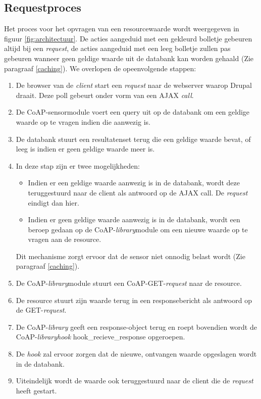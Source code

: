\subsection{Requestproces}
Het proces voor het opvragen van een resourcewaarde wordt weergegeven in figuur \ref{fig:architectuur}. De acties aangeduid met een gekleurd bolletje gebeuren altijd bij een \textit{request}, de acties aangeduid met een leeg bolletje zullen pas gebeuren wanneer geen geldige waarde uit de databank kan worden gehaald (Zie paragraaf \ref{caching}). We overlopen de opeenvolgende stappen:
\begin{enumerate}
\item De browser van de \textit{client} start een \textit{request} naar de webserver waarop Drupal draait. Deze poll gebeurt onder vorm van een AJAX \textit{call}.
\item De CoAP-sensormodule voert een query uit op de databank om een geldige waarde op te vragen indien die aanwezig is.
\item De databank stuurt een resultatenset terug die een geldige waarde bevat, of leeg is indien er geen geldige waarde meer is.
\item In deze stap zijn er twee mogelijkheden:
\begin{itemize}
\item Indien er een geldige waarde aanwezig is in de databank, wordt deze teruggestuurd naar de client als antwoord op de AJAX call. De \textit{request} eindigt dan hier.
\item Indien er geen geldige waarde aanwezig is in de databank, wordt een beroep gedaan op de CoAP-\textit{library}module om een nieuwe waarde op te vragen aan de resource. 
\end{itemize}
Dit mechanisme zorgt ervoor dat de sensor niet onnodig belast wordt (Zie paragraaf \ref{caching}).
\item De CoAP-\textit{library}module stuurt een CoAP-GET-\textit{request} naar de resource.
\item De resource stuurt zijn waarde terug in een responsebericht als antwoord op de GET-\textit{request}.
\item De CoAP-\textit{library} geeft een response-object terug en roept bovendien wordt de CoAP-\textit{library}\textit{hook} hook\_recieve\_response opgeroepen.
\item De \textit{hook} zal ervoor zorgen dat de nieuwe, ontvangen waarde opgeslagen wordt in de databank.
\item Uiteindelijk wordt de waarde ook teruggestuurd naar de client die de \textit{request} heeft gestart.
\end{enumerate}
